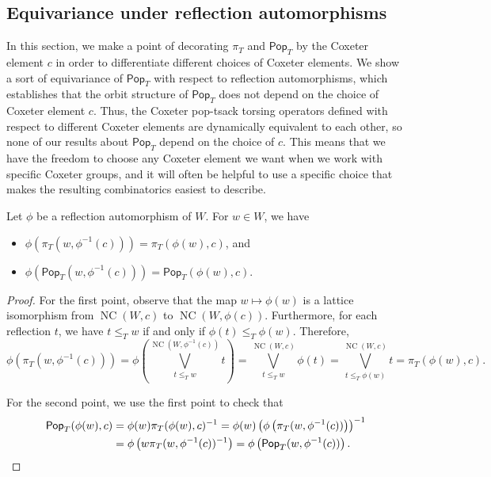 \documentclass[ALCO,ThmDefs,Unicode,epreuves]{cedram}
\newcommand{\pop}{\mathsf{Pop}}
\DeclareMathOperator{\NC}{NC}
\begin{document}
\subsection{Equivariance under reflection automorphisms}

In this section, we make a point of decorating $\pi_T$ and $\pop_T$ by the Coxeter element $c$ in order to differentiate different choices of Coxeter elements.  We show a sort of equivariance of $\pop_T$ with respect to reflection automorphisms, which establishes that the orbit structure of $\pop_T$ does not depend on the choice of Coxeter element $c$.  Thus, the Coxeter pop-tsack torsing operators defined with respect to different Coxeter elements are dynamically equivalent to each other, so none of our results about $\pop_T$ depend on the choice of $c$. This means that we have the freedom to choose any Coxeter element we want when we work with specific Coxeter groups, and it will often be helpful to use a specific choice that makes the resulting combinatorics easiest to describe.

\begin{prop}  Let $\phi$ be a reflection automorphism of $W$.
For $w \in W$, we have
\begin{itemize}
\item $\phi(\pi_T(w,\phi^{-1}(c))) = \pi_T(\phi(w),c)$, and
\item $\phi(\pop_T(w,\phi^{-1}(c))) = \pop_T(\phi(w),c)$.
\end{itemize}
\label{prop:pop_props}
\end{prop}

\begin{proof}
For the first point, observe that the map $w \mapsto \phi(w)$ is a lattice isomorphism from $\NC(W,c)$ to $\NC(W,\phi(c))$.  Furthermore, for each reflection $t$, we have $t \leq_T w$ if and only if $\phi(t) \leq_T \phi(w)$.  Therefore, 
\[
\phi\left(\pi_T(w,\phi^{-1}(c))\right) = \phi\left(\bigvee_{t \leq_T w}^{\NC(W,\phi^{-1}(c))} t\right) = \bigvee_{t \leq_T w}^{\NC(W,c)} \phi(t) = \bigvee_{t \leq_T \phi(w)}^{\NC(W,c)} t = \pi_T(\phi(w),c).\]  


For the second point, we use the first point to check that 
\begin{align*}\pop_T(\phi(w),c) &= \phi(w) \pi_T(\phi(w),c)^{-1} = \phi(w) \left(\phi\left(\pi_T(w,\phi^{-1}(c))\right)\right)^{-1}\\ & = \phi\left(w\pi_T(w,\phi^{-1}( c))^{-1}\right) = \phi\left(\pop_T(w,\phi^{-1}(c))\right) .\qedhere
\end{align*}
\end{proof}
\end{document}
